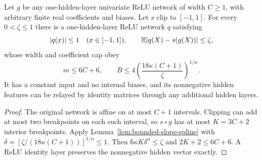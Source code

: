 \begin{corollary}
\label{cor:univariate-compiler}
Let $g$ be any one-hidden-layer univariate ReLU network of width
$C\ge1$, with arbitrary finite real coefficients and biases. Let $s$
clip to $[-1,1]$. For every $0<\zeta\le1$ there is a one-hidden-layer
ReLU network $q$ satisfying
\begin{equation}
 |q(x)|\le1\quad(x\in[-1,1]),\qquad
 \mathbb E|q(X)-s(g(X))|\le\zeta,
 \label{eq:univariate-compiler-error}
\end{equation}
whose width and coefficient cap obey
\begin{equation}
 m\le6C+6,\qquad
 B\le4\left(\frac{18\kappa(C+1)}{\zeta}\right)^{1/\alpha}.
 \label{eq:univariate-compiler-resources}
\end{equation}
It has a constant input and no internal biases, and its nonnegative
hidden features can be relayed by identity matrices through any
additional hidden layers.
\end{corollary}
\begin{proof}
The original network is affine on at most $C+1$ intervals. Clipping
can add at most two breakpoints on each such interval, so $s\circ g$
has at most $K=3C+2$ interior breakpoints. Apply
Lemma~\ref{lem:bounded-slope-spline} with
$\delta=[\zeta/(18\kappa(C+1))]^{1/\alpha}\le1$.
Then $6\kappa K\delta^\alpha\le\zeta$ and
$2K+2\le6C+6$. A ReLU identity layer preserves the nonnegative
hidden vector exactly.
\end{proof}

